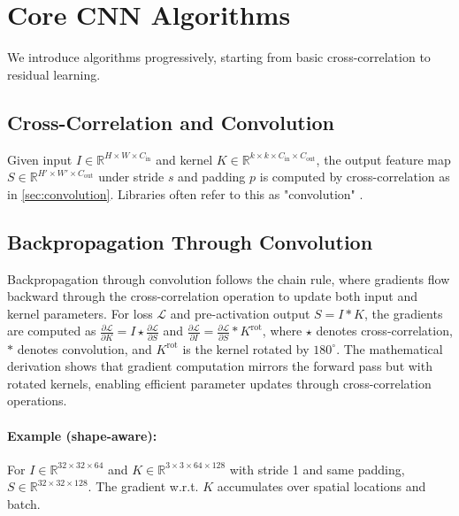 
\section{Core CNN Algorithms }
\label{sec:cnn-algorithms}

We introduce algorithms progressively, starting from basic cross-correlation to residual learning.

\subsection{Cross-Correlation and Convolution}
Given input $I\in\mathbb{R}^{H\times W\times C_{\text{in}}}$ and kernel $K\in\mathbb{R}^{k\times k\times C_{\text{in}}\times C_{\text{out}}}$, the output feature map $S\in\mathbb{R}^{H'\times W'\times C_{\text{out}}}$ under stride $s$ and padding $p$ is computed by cross-correlation as in \cref{sec:convolution}. Libraries often refer to this as "convolution" \cite{GoodfellowEtAl2016}.

\subsection{Backpropagation Through Convolution}
Backpropagation through convolution follows the chain rule, where gradients flow backward through the cross-correlation operation to update both input and kernel parameters. For loss $\mathcal{L}$ and pre-activation output $S = I * K$, the gradients are computed as $\frac{\partial \mathcal{L}}{\partial K} = I \star \frac{\partial \mathcal{L}}{\partial S}$ and $\frac{\partial \mathcal{L}}{\partial I} = \frac{\partial \mathcal{L}}{\partial S} * K^\text{rot}$, where $\star$ denotes cross-correlation, $*$ denotes convolution, and $K^\text{rot}$ is the kernel rotated by $180^{\circ}$. The mathematical derivation shows that gradient computation mirrors the forward pass but with rotated kernels, enabling efficient parameter updates through cross-correlation operations.\cite{GoodfellowEtAl2016}

\paragraph{Example (shape-aware):} For $I\in\mathbb{R}^{32\times32\times 64}$ and $K\in\mathbb{R}^{3\times3\times64\times128}$ with stride 1 and same padding, $S\in\mathbb{R}^{32\times32\times128}$. The gradient w.r.t. $K$ accumulates over spatial locations and batch.

